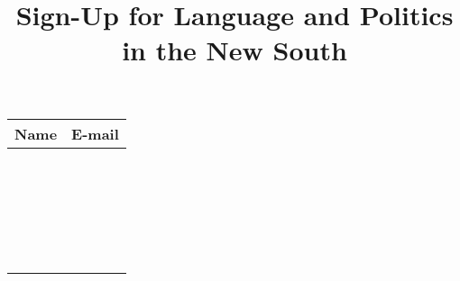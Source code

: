 \documentclass{article}
\title{Sign-Up for Language and Politics in the New South}
\date{}
\newcommand{\tabHeader}[1]{\textbf{#1}}
\begin{document}
  \maketitle
  \centering
  \noindent
  {\LARGE
    \begin{tabular}{| p{} | p{} |}
      \hline
      \tabHeader{Name} & \tabHeader{E-mail} \\
      \hline
                       & \\
      \hline
                       & \\
      \hline
                       & \\
      \hline
                       & \\
      \hline
                       & \\
      \hline
                       & \\
      \hline
                       & \\
      \hline
                       & \\
      \hline
                       & \\
      \hline
                       & \\
      \hline
                       & \\
      \hline
                       & \\
      \hline
                       & \\
      \hline
                       & \\
      \hline
                       & \\
      \hline
                       & \\
      \hline
                       & \\
      \hline
                       & \\
      \hline
                       & \\
      \hline
                       & \\
      \hline
                       & \\
      \hline
                       & \\
      \hline
                       & \\
      \hline
    \end{tabular}
  }
\end{document}
